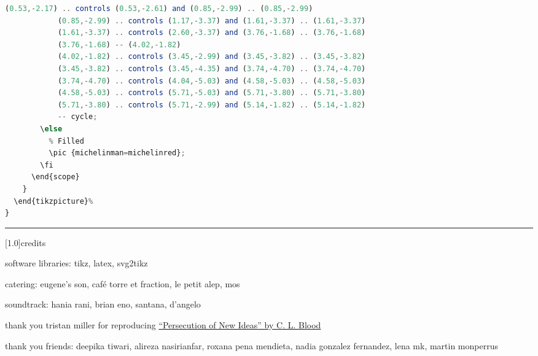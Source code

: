 \documentclass[11pt]{article}
\begin{document}
\begin{multicols}{3}
\begin{lstlisting}[language=JavaScript,caption={The buggy tikz code towards a Michelin star \emoji{-1}},captionpos=b, label={lst:michelinmodel}]
            (0.53,-2.17) .. controls (0.53,-2.61) and (0.85,-2.99) .. (0.85,-2.99)
            (0.85,-2.99) .. controls (1.17,-3.37) and (1.61,-3.37) .. (1.61,-3.37)
            (1.61,-3.37) .. controls (2.60,-3.37) and (3.76,-1.68) .. (3.76,-1.68)
            (3.76,-1.68) -- (4.02,-1.82)
            (4.02,-1.82) .. controls (3.45,-2.99) and (3.45,-3.82) .. (3.45,-3.82)
            (3.45,-3.82) .. controls (3.45,-4.35) and (3.74,-4.70) .. (3.74,-4.70)
            (3.74,-4.70) .. controls (4.04,-5.03) and (4.58,-5.03) .. (4.58,-5.03)
            (4.58,-5.03) .. controls (5.71,-5.03) and (5.71,-3.80) .. (5.71,-3.80)
            (5.71,-3.80) .. controls (5.71,-2.99) and (5.14,-1.82) .. (5.14,-1.82)
            -- cycle;
        \else
          % Filled
          \pic {michelinman=michelinred};
        \fi
      \end{scope}
    }
  \end{tikzpicture}%
}


\end{lstlisting}



\begin{centering}
\vspace{3mm}

\rule[3pt]{2em}{0.7pt}

\vspace{2mm}

\large \scalebox{1.2}[1.0]{credits}

software libraries: tikz, latex, svg2tikz

catering: eugene's son, café torre et fraction, le petit alep, mos

soundtrack: hania rani, brian eno, santana, d'angelo

thank you tristan miller for reproducing \href{https://github.com/logological/blood}{``Persecution of New Ideas'' by C. L. Blood}

thank you friends: deepika tiwari, alireza nasirianfar, roxana pena mendieta, nadia gonzalez fernandez, lena mk, martin monperrus

    
\end{centering}




\end{multicols}
\end{document}
